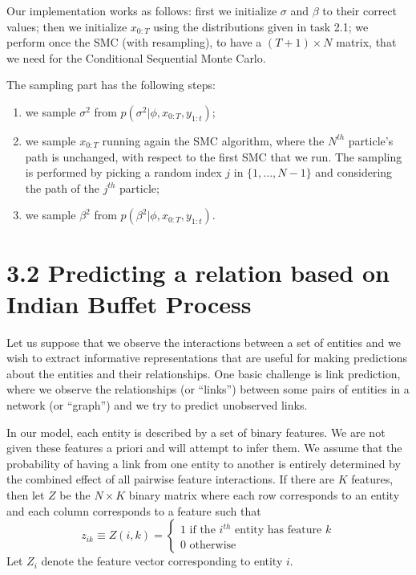 \documentclass[]{article}
\begin{document}
Our implementation works as follows: first we initialize $\sigma$ and $\beta$ to their correct values; then we initialize $x_{0:T}$ using the distributions given in task 2.1; we perform once the SMC (with resampling), to have a $(T+1) \times N$ matrix, that we need for the Conditional Sequential Monte Carlo.

The sampling part has the following steps:
\begin{enumerate}
	\item we sample $\sigma^2$ from $p(\sigma^2|\phi, x_{0:T}, y_{1:t})$;
	\item we sample $x_{0:T}$ running again the SMC algorithm, where  the $N^{th}$ particle's path is unchanged, with respect to the first SMC that we run. The sampling is performed by picking a random index $j$ in $\{1,...,N-1\}$ and considering the path of the $j^{th}$ particle;
	\item we sample $\beta^2$ from $p(\beta^2|\phi, x_{0:T}, y_{1:t})$.
\end{enumerate}

\newpage

\section*{3.2 Predicting a relation based on Indian Buffet Process}
Let us suppose that we observe the interactions between a set of entities and we wish to extract informative representations that are useful for making predictions about the entities and their relationships. One basic challenge is link prediction, where we observe the relationships (or “links”) between some pairs of entities in a network (or “graph”) and we try to predict unobserved links. 

In our model, each entity is described by a set of binary features. We are not given these features a priori and will attempt to infer them. We assume that the probability of having a link from one entity to another is entirely determined by the combined effect of all pairwise feature interactions. If there are $K$ features, then let $Z$ be the $N \times K$ binary matrix where each row corresponds to an entity and each column corresponds to a feature such that
$$ 
z_{ik} \equiv Z(i,k) = 
\begin{cases}
	1 \text{\ \ \ if the $i^{th}$ entity has feature $k$} \\
	0 \text{\ \ \ otherwise}
\end{cases}
$$
Let $Z_i$ denote the feature vector corresponding to entity $i$.
\end{document}
